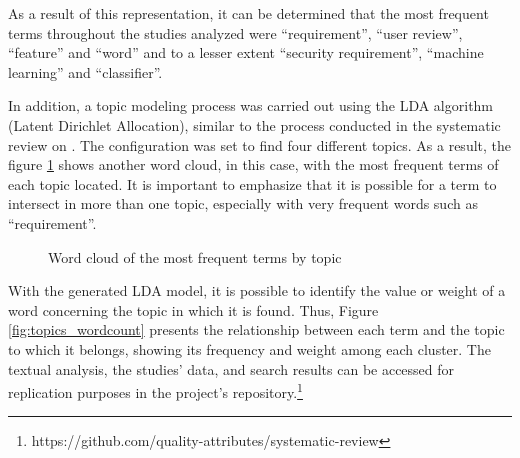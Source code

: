 \documentclass[conference]{IEEEtran}
\newcommand{\quotes}[1]{``#1''}
\begin{document}
As a result of this representation, it can be determined that the most frequent terms throughout the studies analyzed were \quotes{requirement}, \quotes{user review}, \quotes{feature} and \quotes{word} and to a lesser extent \quotes{security requirement}, \quotes{machine learning} and \quotes{classifier}.

In addition, a topic modeling process was carried out using the LDA algorithm (Latent Dirichlet Allocation), similar to the process conducted in the systematic review on \cite{Sun2017}. The configuration was set to find four different topics. As a result, the figure \ref{fig:topic_wordcloud} shows another word cloud, in this case, with the most frequent terms of each topic located. It is important to emphasize that it is possible for a term to intersect in more than one topic, especially with very frequent words such as \quotes{requirement}.

\begin{figure}[!htbp]
    \caption{\label{fig:topic_wordcloud}Word cloud of the most frequent terms by topic}
\end{figure}

With the generated LDA model, it is possible to identify the value or weight of a word concerning the topic in which it is found. Thus, Figure \ref{fig:topics_wordcount} presents the relationship between each term and the topic to which it belongs, showing its frequency and weight among each cluster. The textual analysis, the studies' data, and search results can be accessed for replication purposes in the project's repository.\footnote{https://github.com/quality-attributes/systematic-review}
\end{document}
